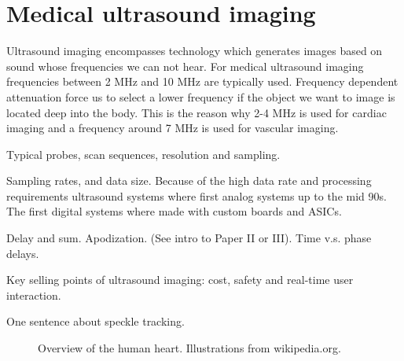 \section {Medical ultrasound imaging}\label{sec:ultrasound}
Ultrasound imaging encompasses technology which generates images based on sound whose frequencies we can not hear. For medical ultrasound imaging frequencies between 2 MHz and 10 MHz are typically used. Frequency dependent attenuation force us to select a lower frequency if the object we want to image is located deep into the body. This is the reason why 2-4 MHz is used for cardiac imaging and a frequency around 7 MHz is used for vascular imaging.

Typical probes, scan sequences, resolution and sampling.

Sampling rates, and data size.
Because of the high data rate and processing requirements ultrasound systems where first analog systems up to the mid 90s. The first digital systems where made with custom boards and ASICs.

Delay and sum. Apodization. (See intro to Paper II or III).
Time v.s. phase delays.

Key selling points of ultrasound imaging: cost, safety and real-time user interaction.

One sentence about speckle tracking.

\begin{figure}
\centering
{}
\caption{Overview of the human heart. Illustrations from wikipedia.org.}
\label{fig:human_heart}
\end{figure}

